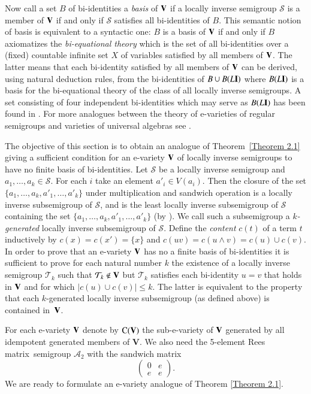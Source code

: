 \documentclass[preprint,1p,times]{elsarticle}
\numberwithin{equation}{section}
\theoremstyle{remark}
\def\pv#1{{\bf #1}}
\def\Vc{\mathbf{V}}
\def\we{\wedge}
\def\Co{{\mathrm C}}
\def\Rm{Rees matrix}
\begin{document}
Now call a set $B$ of bi-identities a \emph{basis} of $\pv V$ if
 a locally inverse semigroup $\mathcal S$ is a member
of $\pv V$ if and only if $\mathcal S$ satisfies all bi-identities of $B$. This semantic notion of basis is equivalent
to a syntactic one: $B$ is a basis of  $\pv V$ if and only if $B$ axiomatizes the \emph{bi-equational theory} which is
the set of all bi-identities over a (fixed) countable infinite set $X$ of variables satisfied by all members of $\pv
V$. The latter means that  each bi-identity satisfied by all members of $\pv V$ can be derived, using natural deduction
rules, from the bi-identities of $B\cup B(L\pv I)$ where $B(L\pv I)$ is a basis for the bi-equational theory of the
class of all locally inverse semigroups. A set consisting of four independent bi-identities which may serve as $B(L\pv
I)$ has been found in \cite{A3}. For more analogues between the theory of e-varieties of regular semigroups and
varieties of universal algebras see \cite{A2,A3,KS,Y1}.

The objective of this section is to obtain an analogue of Theorem~\ref{Theorem 2.1} giving a sufficient condition for
an e-variety $\pv V$ of locally inverse semigroups to have no finite basis of bi-identities. Let $\mathcal S$ be a
locally inverse semigroup and $a_1,\dots,a_k\in \mathcal S$. For each $i$ take an element $a'_i\in V(a_i)$. Then the
closure of the set $\{a_1,\dots,a_k,a'_1,\dots,a'_k\}$ under multiplication and sandwich operation  is a locally
inverse subsemigroup of $\mathcal S$, and is the least locally inverse subsemigroup of $\mathcal S$ containing the set
$\{a_1,\dots,a_k,a'_1,\dots,a'_k\}$ (by \cite{Y1}). We call such a subsemigroup a {\it $k$-generated} locally inverse
subsemigroup of $\mathcal S$. Define the {\it content} $c(t)$ of a term $t$ inductively by $c(x)=c(x')=\{x\}$ and
$c(uv)=c(u\we v)=c(u)\cup c(v)$. In order to prove that an e-variety $\pv V$ has no a finite basis of bi-identities it
is sufficient to prove for each natural number $k$ the existence of a locally inverse semigroup $\mathcal{T}_k$ such
that $\mathcal{T}_k\not\in \pv V$ but $\mathcal{T}_k$ satisfies each bi-identity $u=v$ that holds in $\pv V$ and for
which $\vert c(u)\cup c(v)\vert \le k$. The latter is equivalent to the property that each $k$-generated locally
inverse subsemigroup (as defined above) is contained in~$\pv V$.

For each e-variety $\pv V$ denote by $\Co(\pv V)$ the sub-e-variety of $\pv V$ generated by all idempotent generated
members of $\Vc$. We also need the 5-element \Rm\ semigroup $\mathcal{A}_2$ with the sandwich matrix
\begin{equation}
\label{matrix for TA}
\begin{pmatrix}
0 & e\\
e & e
\end{pmatrix}.
\end{equation} We
are ready to formulate an e-variety analogue of Theorem \ref{Theorem 2.1}.
\end{document}
